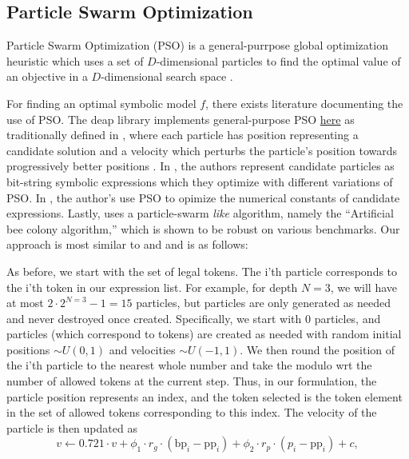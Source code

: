 \documentclass[12pt]{iopart}
\begin{document}
\subsection{Particle Swarm Optimization} \label{subsec:ParticleSwarmOptimization}
Particle Swarm Optimization (PSO) is a general-purrpose global optimization heuristic which uses a set of $D$-dimensional particles to find the optimal value of an objective in a $D$-dimensional search space \cite{clerc:hal-00764996}. 
\par For finding an optimal symbolic model $f$, there exists literature documenting the use of PSO. The deap library implements general-purpose PSO \href{https://github.com/DEAP/deap/blob/60913c5543abf8318ddce0492e8ffcdf37974d86/examples/pso/basic.py}{here} as traditionally defined in \cite{PoliOverviewPSO}, where each particle has position representing a candidate solution and a velocity which perturbs the particle's position towards progressively better positions \cite{DEAP_JMLR2012}. In \cite{10.1007/978-3-319-70093-9_37}, the authors represent candidate particles as bit-string symbolic expressions which they optimize with different variations of PSO. In \cite{Lu2021}, the author's use PSO to opimize the numerical constants of candidate expressions. Lastly, \cite{KARABOGA20121} uses a particle-swarm \emph{like} algorithm, namely the ``Artificial bee colony algorithm,'' which is shown to be robust on various benchmarks. Our approach is most similar to \cite{DEAP_JMLR2012} and \cite{10.1007/978-3-319-70093-9_37} and is as follows:
\par As before, we start with the set of legal tokens. The i'th particle corresponds to the i'th token in our expression list. For example, for depth $N = 3$, we will have at most $2\cdot 2^{N = 3} - 1 = 15$ particles, but particles are only generated as needed and never destroyed once created. Specifically, we start with 0 particles, and particles (which correspond to tokens) are created as needed with random initial positions $\sim U(0,1)$ and velocities $\sim U(-1,1)$. We then round the position of the i'th particle to the nearest whole number and take the modulo wrt the number of allowed tokens at the current step. Thus, in our formulation, the particle position represents an index, and the token selected is the token element in the set of allowed tokens corresponding to this index. The velocity of the particle is then updated as \cite{clerc:hal-00764996} \cite{offShellPSO}
\begin{equation}
		v \gets 0.721\cdot v + \phi_1 \cdot r_g \cdot (\mathrm{bp}_i - \mathrm{pp}_i) + \phi_2\cdot r_p \cdot (p_i - \mathrm{pp}_i) + c,
\end{equation}
\end{document}
